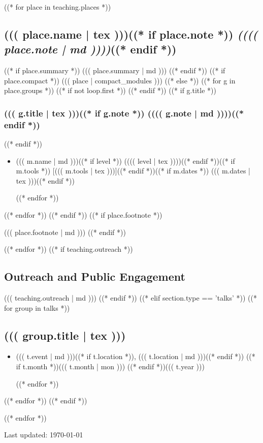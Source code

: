 \documentclass[a4paper,10pt]{article}
\newcommand{\paren}[1]{(#1)}
\newcommand{\cvtag}[1]{{\footnotesize\textcolor{accentgray}{[#1]}}}
\begin{document}
\vspace{4pt}
((* for place in teaching.places *))
\subsection*{((( place.name | tex )))((* if place.note *)) \normalfont\textit{\paren{((( place.note | md )))}}((* endif *))}
((* if place.summary *))
((( place.summary | md )))
((* endif *))
((* if place.compact *))
((( place | compact_modules )))
((* else *))
((* for g in place.groups *))
((* if not loop.first *))
\vspace{-0.5em}
((* endif *))
((* if g.title *))
\subsubsection*{((( g.title | tex )))((* if g.note *)) \paren{((( g.note | md )))}((* endif *))}
((* endif *))
\begin{itemize}
((* for m in g.modules *))
((* set level = [m.level, m.note] | select | join(', ') *))
    \item ((( m.name | md )))((* if level *)) \paren{((( level | tex )))}((* endif *))((* if m.tools *)) \cvtag{((( m.tools | tex )))}((* endif *))((* if m.dates *)) \hfill ((( m.dates | tex )))((* endif *))

((* endfor *))
\end{itemize}
((* endfor *))
((* endif *))
((* if place.footnote *))

\vspace{2pt}
((( place.footnote | md )))
((* endif *))

((* endfor *))
((* if teaching.outreach *))
\subsection*{Outreach and Public Engagement}
((( teaching.outreach | md )))
((* endif *))
((* elif section.type == 'talks' *))
((* for group in talks *))

\subsection*{((( group.title | tex )))}
\begin{itemize}
((* for t in group.talks *))
    \item ((( t.event | md )))((* if t.location *)), ((( t.location | md )))((* endif *)) \hfill ((* if t.month *))((( t.month | mon ))) ((* endif *))((( t.year )))

((* endfor *))
\end{itemize}
((* endfor *))
((* endif *))

((* endfor *))
\vfill
\begin{center}
    \footnotesize\color{accentgray}
    Last updated: \today
\end{center}
\end{document}
